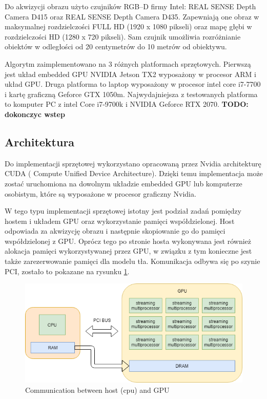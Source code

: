 \documentclass[b5paper,10pt,twoside]{article}
\begin{document}
{Do akwizycji obrazu użyto czujników RGB--D firmy Intel: REAL SENSE Depth Camera D415 oraz REAL SENSE Depth Camera D435. Zapewniają
one obraz w maksymalnej rozdzielczości FULL HD (1920 x 1080 pikseli) oraz mapę głębi w rozdzielczości HD (1280 x 720 pikseli). Sam czujnik umożliwia rozróżnianie obiektów w odległości od 20 centymetrów do 10 metrów od obiektywu.

Algorytm zaimplementowano na 3 różnych platformach sprzętowych. Pierwszą jest układ embedded GPU NVIDIA Jetson TX2 wyposażony w procesor ARM i układ GPU. Druga platforma to laptop wyposażony w procesor intel core i7-7700 i kartę graficzną Geforce GTX 1050m. Najwydajniejsza z testowanych platforma to komputer PC z intel Core i7-9700k i NVIDIA Geforce RTX 2070.
\textbf{TODO: dokonczyc wstep}

\subsection{Architektura}
\label{subsec:architecture}

Do implementacji sprzętowej wykorzystano opracowaną przez Nvidia architekturę CUDA ( Compute Unified Device Architecture). Dzięki temu implementacja może zostać uruchomiona na dowolnym układzie embedded GPU lub komputerze osobistym, które są wyposażone w procesor graficzny Nvidia. 

W tego typu implementacji sprzętowej istotny jest podział zadań pomiędzy hostem i układem GPU oraz wykorzystanie pamięci współdzielonej. Host odpowiada za akwizycję obrazu i następnie skopiowanie go do pamięci współdzielonej z GPU. Oprócz tego po stronie hosta wykonywana jest również alokacja pamięci wykorzystywanej przez GPU, w związku z tym konieczne jest także zarezerwowanie pamięci dla modelu tła. Komunikacja odbywa się po szynie PCI, zostało to pokazane na rysunku \ref{fig:cpu_host}. 


\begin{figure}[!t]
	\begin{center}
		\includegraphics[scale=0.50]{img/cpu_host.png}
		\caption{Communication between host (cpu) and GPU}
		\label{fig:cpu_host}
	\end{center}
\end{figure}

}
\end{document}

